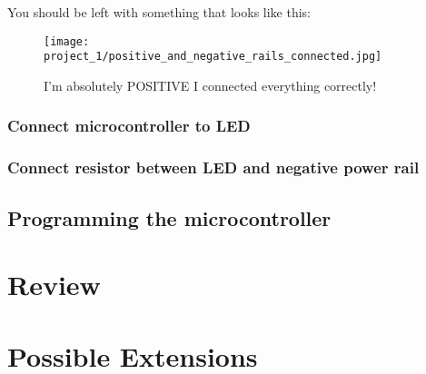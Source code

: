 You should be left with something that looks like this:
\begin{figure}[h!]
    \centering
    \texttt{[image: project\_1/positive\_and\_negative\_rails\_connected.jpg]}
    \caption{I'm absolutely POSITIVE I connected everything correctly!}
    \label{fig:positives_and_negatives}
\end{figure}

\subsubsection{Connect microcontroller to LED}

\subsubsection{Connect resistor between LED and negative power rail}

\subsection{Programming the microcontroller}

\section{Review}

\section{Possible Extensions}

